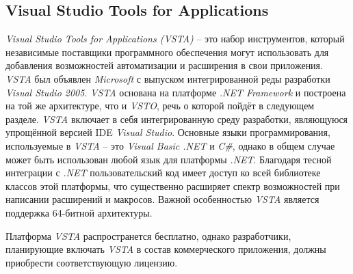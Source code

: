 \subsection{Visual Studio Tools for Applications}

{\it Visual Studio Tools for Applications (VSTA)} -- это набор инструментов, который независимые поставщики программного обеспечения могут использовать для добавления возможностей автоматизации и расширения в свои приложения. {\it VSTA} был объявлен {\it Microsoft} с выпуском интегрированной реды разработки {\it Visual Studio 2005}. {\it VSTA} основана на платформе {\it .NET Framework} и построена на той же архитектуре, что и {\it VSTO}, речь о которой пойдёт в следующем разделе. {\it VSTA} включает в себя интегрированную среду разработки, являющуюся упрощённой версией IDE {\it Visual Studio}. Основные языки программирования, используемые в {\it VSTA} -- это {\it Visual Basic .NET} и {\it C\#}, однако в общем случае может быть использован любой язык для платформы {\it .NET}. Благодаря тесной интеграции с {\it .NET} пользовательский код имеет доступ ко всей библиотеке классов этой платформы, что существенно расширяет спектр возможностей при написании расширений и макросов. Важной особенностью {\it VSTA} является поддержка 64-битной архитектуры. 

Платформа {\it VSTA} распространется бесплатно, однако разработчики, планирующие включать {\it VSTA} в состав коммерческого приложения, должны приобрести соответствующую лицензию.